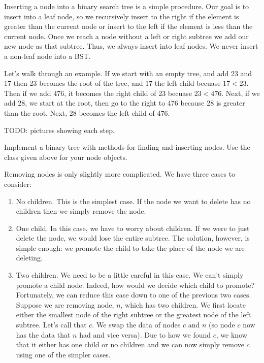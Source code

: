 Inserting a node into a binary search tree is a simple procedure.
Our goal is to insert into a leaf node, so
we recursively insert to the right if the element is greater than the current node
or insert to the left if the element is less than the current node.
Once we reach a node without a left or right subtree we add our new node as that subtree.
Thus, we always insert into leaf nodes.
We never insert a non-leaf node into a BST.

Let's walk through an example.
If we start with an empty tree, and add 23 and 17 then
23 becomes the root of the tree, and 17 the left child becuase $17 < 23$. 
Then if we add 476, it becomes the right child of 23 becuase $23 < 476$.
Next, if we add 28, we start at the root, then go to the right to 476 because 28 is greater than the root.
Next, 28 becomes the left child of 476.

TODO: pictures showing each step.

\begin{problem}
Implement a binary tree with methods for finding and inserting nodes.
Use the  class given above for your node objects.
\label{prob:BST1}
\end{problem}

Removing nodes is only slightly more complicated.
We have three cases to consider:
\begin{enumerate} %
\item No children.  This is the simplest case.  If the node we want to delete has no children then we simply remove the node.
\item One child.  In this case, we have to worry about children.
If we were to just delete the node, we would lose the entire subtree.
The solution, however, is simple enough:
we promote the child to take the place of the node we are deleting.
\item Two children.  We need to be a little careful in this case.
We can't simply promote a child node.  Indeed, how would we decide which child to promote?
Fortunately, we can reduce this case down to one of the previous two cases.
Suppose we are removing node, $n$, which has two children.
We first locate either the smallest node of the right subtree or the greatest node of the left subtree.
Let's call that $c$.
We swap the data of nodes $c$ and $n$ (so node $c$ now has the data that $n$ had and vice versa).
Due to how we found $c$, we know that it either has one child or no children and we can now simply remove $c$ using one of the simpler cases.
\end{enumerate}


